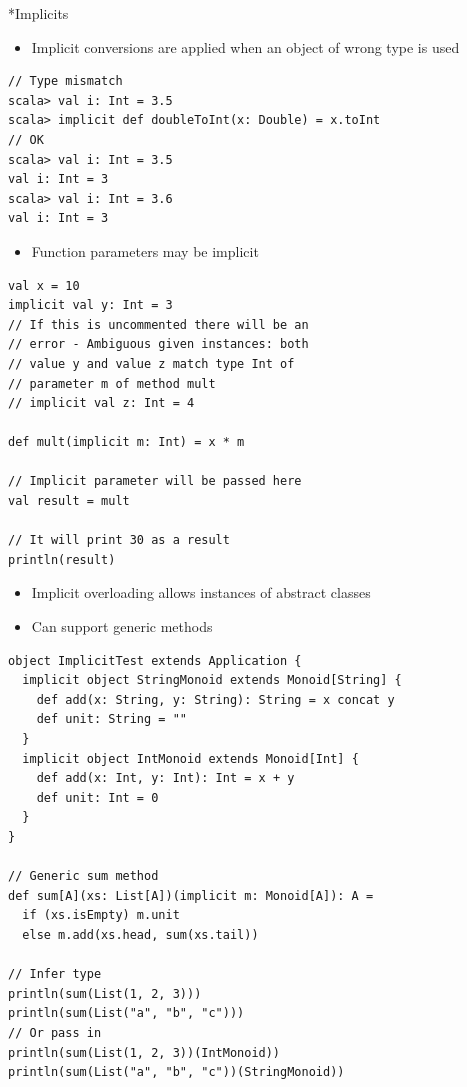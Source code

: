 \documentclass[a4paper]{article}
\makeatletter
\renewcommand{\subsection}{
  \@startsection{subsection}{2}{0pt}{1ex}{1ex} {\raggedleft\normalfont\normalsize\bfseries\fbox}}
\makeatother
\begin{document}
\begin{multicols*}{3}
  \subsection*{Implicits}
    \begin{itemize}[leftmargin=*]
      \item Implicit conversions are applied when an object of wrong type is used
    \end{itemize}
    \begin{lstlisting}
// Type mismatch
scala> val i: Int = 3.5
scala> implicit def doubleToInt(x: Double) = x.toInt
// OK
scala> val i: Int = 3.5
val i: Int = 3
scala> val i: Int = 3.6
val i: Int = 3
    \end{lstlisting}
    \begin{itemize}[leftmargin=*]
      \item Function parameters may be implicit
    \end{itemize}
    \begin{lstlisting}
val x = 10
implicit val y: Int = 3
// If this is uncommented there will be an
// error - Ambiguous given instances: both
// value y and value z match type Int of
// parameter m of method mult
// implicit val z: Int = 4

def mult(implicit m: Int) = x * m
  
// Implicit parameter will be passed here
val result = mult 
  
// It will print 30 as a result
println(result) 
    \end{lstlisting}
    \begin{itemize}[leftmargin=*]
      \item Implicit overloading allows instances of abstract classes
      \item Can support generic methods
    \end{itemize}
    \begin{lstlisting}
object ImplicitTest extends Application {
  implicit object StringMonoid extends Monoid[String] {
    def add(x: String, y: String): String = x concat y
    def unit: String = ""
  }
  implicit object IntMonoid extends Monoid[Int] {
    def add(x: Int, y: Int): Int = x + y
    def unit: Int = 0
  }
}

// Generic sum method
def sum[A](xs: List[A])(implicit m: Monoid[A]): A =
  if (xs.isEmpty) m.unit
  else m.add(xs.head, sum(xs.tail))

// Infer type
println(sum(List(1, 2, 3)))
println(sum(List("a", "b", "c")))
// Or pass in
println(sum(List(1, 2, 3))(IntMonoid))
println(sum(List("a", "b", "c"))(StringMonoid))
    \end{lstlisting}

\end{multicols*}
\end{document}
